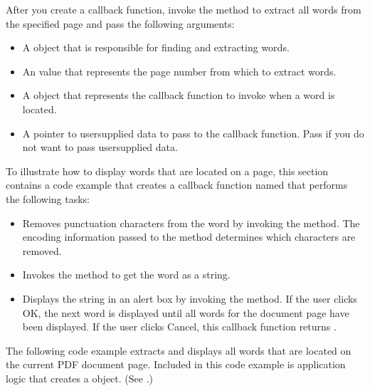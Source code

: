 \documentclass[letterpaper,12pt,english,openany,oneside]{sphinxmanual}
\begin{document}
After you create a callback function, invoke the  method to extract all words from the specified page and pass the following arguments:
\begin{itemize}
\item {} 
A  object that is responsible for finding and extracting words.

\item {} 
An  value that represents the page number from which to extract words.

\item {} 
A  object that represents the callback function to invoke when a word is located.

\item {} 
A pointer to user\sphinxhyphen{}supplied data to pass to the callback function. Pass  if you do not want to pass user\sphinxhyphen{}supplied data.

\end{itemize}

To illustrate how to display words that are located on a page, this section contains a code example that creates a callback function named  that performs the following tasks:
\begin{itemize}
\item {} 
Removes punctuation characters from the word by invoking the  method. The encoding information passed to the  method determines which characters are removed.

\item {} 
Invokes the  method to get the word as a string.

\item {} 
Displays the string in an alert box by invoking the  method. If the user clicks OK, the next word is displayed until all words for the document page have been displayed. If the user clicks Cancel, this callback function returns .

\end{itemize}

The following code example extracts and displays all words that are located on the current PDF document page. Included in this code example is application logic that creates a  object. (See .)
\end{document}

